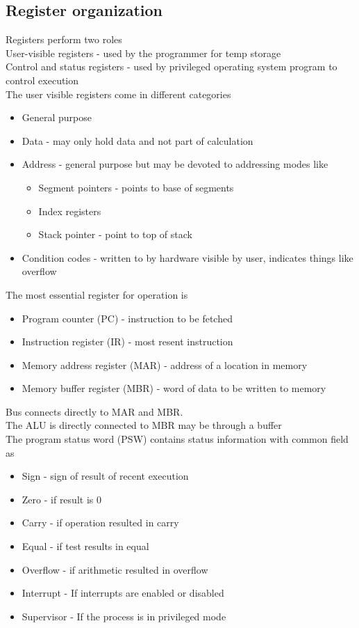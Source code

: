\documentclass[12pt, a4paper]{article}
\begin{document}
		\subsection{Register organization}
			Registers perform two roles\\
			User-visible registers - used by the programmer for temp storage\\
			Control and status registers - used by privileged operating system program to control execution\\
			The user visible registers come in different categories
			\begin{itemize}
				\item General purpose
				\item Data - may only hold data and not part of calculation
				\item Address - general purpose but may be devoted to addressing modes like
				\begin{itemize}
					\item Segment pointers - points to base of segments
					\item Index registers
					\item Stack pointer - point to top of stack
				\end{itemize}
				\item Condition codes - written to by hardware visible by user, indicates things like overflow
			\end{itemize}
			The most essential register for operation is
			\begin{itemize}
				\item Program counter (PC) - instruction to be fetched
				\item Instruction register (IR) - most resent instruction
				\item Memory address register (MAR) - address of a location in memory
				\item Memory buffer register (MBR) - word of data to be written to memory
			\end{itemize}
			Bus connects directly to MAR and MBR.\\
			The ALU is directly connected to MBR may be through a buffer\\
			The program status word (PSW) contains status information with common field as
			\begin{itemize}
				\item Sign - sign of result of recent execution
				\item Zero - if result is 0
				\item Carry - if operation resulted in carry
				\item Equal - if test results in equal
				\item Overflow - if arithmetic resulted in overflow
				\item Interrupt - If interrupts are enabled or disabled
				\item Supervisor - If the process is in privileged mode
			\end{itemize}
\end{document}

